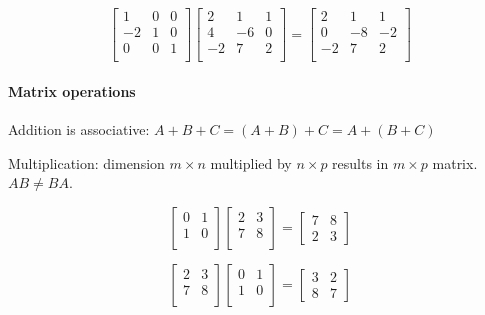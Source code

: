 \[
	\begin{bmatrix}
		1 & 0 & 0 \\
		-2 & 1 & 0 \\
		0 & 0 & 1 \\
	\end{bmatrix}
	\begin{bmatrix}
		2 & 1 & 1 \\
		4 & -6 & 0 \\
		-2 & 7 & 2 \\
	\end{bmatrix} = 
	\begin{bmatrix}
		2 & 1 & 1 \\
		0 & -8 & -2 \\
		-2 & 7 & 2 \\
	\end{bmatrix}
\]

\paragraph{Matrix operations} Addition is associative: $A+B+C = (A+B) + C = A+ (B+C)$

Multiplication: dimension $m \times n$ multiplied by $n \times p$ results in $m \times p$ matrix. $AB \neq BA$.

\[
	\begin{bmatrix}
		0 & 1 \\ 1 & 0\\
	\end{bmatrix}
	\begin{bmatrix}
		2 & 3 \\ 7 & 8 \\ 
	\end{bmatrix} =
	\begin{bmatrix}
		7 & 8 \\ 2 & 3
	\end{bmatrix}
\]

\[
	\begin{bmatrix}
		2 & 3 \\ 7 & 8 \\ 
	\end{bmatrix} 
	\begin{bmatrix}
		0 & 1 \\ 1 & 0\\
	\end{bmatrix}=
	\begin{bmatrix}
		3 & 2 \\ 8 & 7
	\end{bmatrix}
\]

